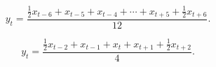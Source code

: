 \documentclass[12pt]{article}
\begin{document}
\pagestyle{empty}
{\newpage
\clearpage
\samepage \begin{displaymath}y_t = \frac{\frac{1}{2}x_{t - 6} + x_{t - 5} + x_{t - 4} + \cdots + 
x_{t + 5} + \frac{1}{2}x_{t + 6}}{12}.\end{displaymath}
}

{\newpage
\clearpage
\samepage \begin{displaymath}y_t = \frac{\frac{1}{2}x_{t - 2} + x_{t - 1} + x_{t} + 
x_{t + 1} + \frac{1}{2}x_{t + 2}}{4}.\end{displaymath}
}
\end{document}
